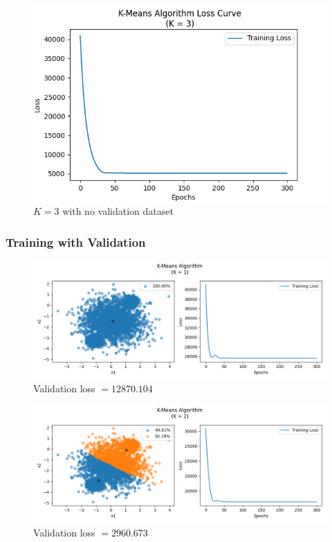 \documentclass[letterpaper]{article}
\begin{document}
\begin{figure}[H]
	\centering
	\includegraphics[width=\linewidth]{Figure_1}
	\caption{$K = 3$ with no validation dataset}
	\label{fig:plot1}
\end{figure}

\subsubsection{Training with Validation}

\begin{figure}[H]
	\centering
	\includegraphics[width=\linewidth]{Figure_2}
	\caption{Validation loss $ = 12870.104$}
	\label{fig:plot2}
\end{figure}

\begin{figure}[H]
	\centering
	\includegraphics[width=\linewidth]{Figure_3}
	\caption{Validation loss $ = 2960.673$}
	\label{fig:plot3}
\end{figure}
\end{document}
